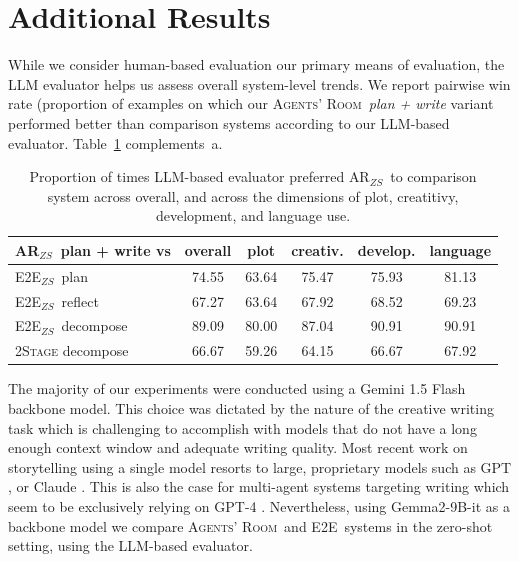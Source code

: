 \documentclass{article}
\newcommand{\Agentsroom}{\textsc{Agents' Room}}
\newcommand{\agentsroomzs}{{\sc AR$_{ZS}$}}
\newcommand{\baseline}{{\sc E2E}}
\newcommand{\baselinezs}{{\sc E2E$_{ZS}$}}
\begin{document}
\section{Additional Results}
\label{sec:additional-results}

While we consider human-based evaluation our primary means of
evaluation, the LLM evaluator helps us assess overall system-level
trends. We report pairwise win rate (proportion of examples on which
our \Agentsroom~{\it plan + write} variant performed better than
comparison systems according to our LLM-based
evaluator. Table~\ref{tab:additional-results} complements~a.

  \begin{table}[h!]
\centering
    \begin{tabular}{lccccc} \toprule
\agentsroomzs~plan + write vs  & overall &	plot &	creativ. &	develop. &
language \\ \midrule
 \baselinezs\ plan   &	74.55  &	63.64  &	75.47  &	75.93 & 	81.13\\
\baselinezs\ reflect  &	67.27  &	63.64  &	67.92  &	68.52  &	69.23\\
\baselinezs\ decompose & 	89.09  &	80.00  &	87.04  &	90.91  &	90.91\\
\textsc{2Stage} decompose 	 &66.67  &
59.26 & 	64.15  &	66.67 & 	67.92\\ \bottomrule
    \end{tabular}
    \caption{\label{tab:additional-results} Proportion of times
      LLM-based evaluator preferred \agentsroomzs\ to comparison system
      across overall, and across the dimensions of plot, creatitivy,
      development, and language use.}
  \end{table}


The majority of our experiments were conducted using a Gemini 1.5
Flash backbone model. This choice was dictated by the nature of the
creative writing task which is challenging to accomplish with models
that do not have a long enough context window and adequate writing
quality. Most recent work on storytelling using a single model resorts
to large, proprietary models such as GPT
\citep{yang-etal-2023-doc,yang-etal-2022-re3}, or Claude
  \citep{chakrabarty:ea:2024a}. This is also the case for multi-agent
  systems targeting writing which seem to be exclusively relying on
  GPT-4
  \citep{ijcai2024p3,bai2024longwriterunleashing10000word}. Nevertheless,
using Gemma2-9B-it  \citep{Riviere2024Gemma2I} as a backbone model we
compare \Agentsroom\ and \baseline\ systems in the zero-shot setting,
using the LLM-based evaluator. 
\end{document}
